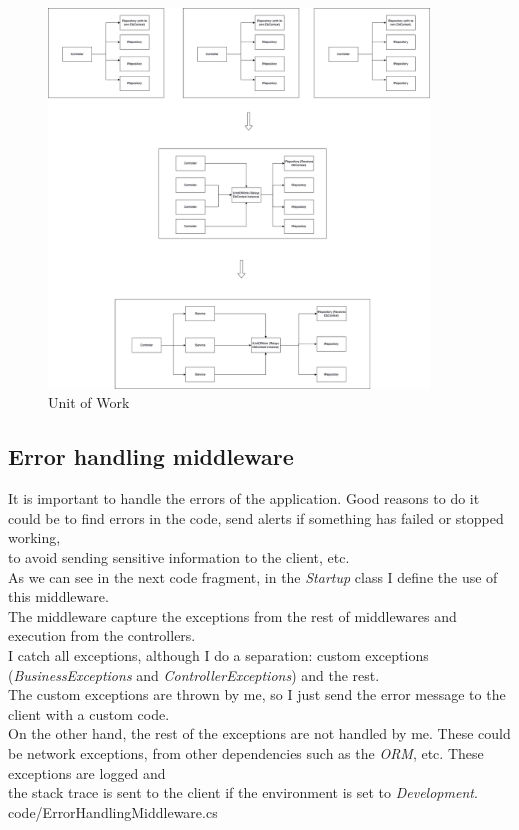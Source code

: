             \begin{figure}[H]
                \centering
                    \includegraphics[width=0.9\textwidth]{assets/diagrams/unitofwork.png}
                \caption{Unit of Work}
                \label{fig:implementation_unit_work}
            \end{figure}
    
    \subsection{Error handling middleware}
    It is important to handle the errors of the application. Good reasons to do it could be to find errors in the code, send alerts if something has failed or stopped working, \\
    to avoid sending sensitive information to the client, etc. \\

    As we can see in the next code fragment, in the \textit{Startup} class I define the use of this middleware. \\
    The middleware capture the exceptions from the rest of middlewares and execution from the controllers. \\

    I catch all exceptions, although I do a separation: custom exceptions (\textit{BusinessExceptions} and \textit{ControllerExceptions}) and the rest. \\
    The custom exceptions are thrown by me, so I just send the error message to the client with a custom code. \\
    On the other hand, the rest of the exceptions are not handled by me. These could be network exceptions, from other dependencies such as the \textit{ORM}, etc. These exceptions are logged and \\
    the stack trace is sent to the client if the environment is set to \textit{Development}. \\
    
    {code/ErrorHandlingMiddleware.cs}

